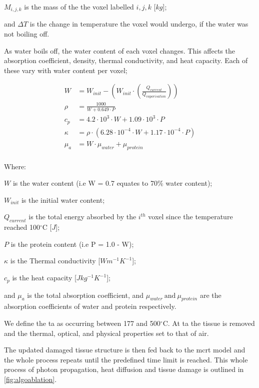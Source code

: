 	\indent $M_{i,j,k}$ is the mass of the the voxel labelled $i,j,k$ [$kg$];
	
	\indent and $\Delta T$ is the change in temperature the voxel would undergo, if the water was not boiling off.

	\medskip
	
As water boils off, the water content of each voxel changes. This affects the absorption coefficient, density, thermal conductivity, and heat capacity. Each of these vary with water content per voxel\cite{loiola2018thermal};

\begin{align}
W &= W_{init} - \left(W_{init} \cdot \left(\tfrac{Q_{current}}{Q_{vaporisation}}\right)\right) \\
\rho &= \frac{1000}{W + 0.649\cdot P} \\
c_p &= 4.2\cdot 10^{3}\cdot W + 1.09\cdot 10^{3}\cdot P \\
\kappa &= \rho \cdot (6.28\cdot 10^{-4}\cdot W + 1.17\cdot 10^{-4} \cdot P)\\
\mu_a &= W \cdot \mu_{water} + \mu_{protein}\\
\end{align}

\noindent Where:

\indent $W$ is the water content (i.e W = 0.7 equates to 70\% water content);

\indent $W_{init}$ is the initial water content;

\indent $Q_{current}$ is the total energy absorbed by the $i^{th}$ voxel since the temperature reached 100$^{\circ}$C [$J$];

\indent $P$ is the protein content (i.e P = 1.0 - W);

\indent $\kappa$ is the Thermal conductivity [$W m^{-1} K^{-1}$];

\indent $c_p$ is the heat capacity [$J kg^{-1} K^{-1}$];

\indent and $\mu_a$ is the total absorption coefficient, and $\mu_{water}\ \text{and}\ \mu_{protein}$ are the absorption coefficients of water and protein respectively.

\medskip

We define the \gls{ta} as occurring between 177 and 500$^{\circ}$C\cite{gerstmann1994char,mckenzie1986three,sagi1992heating}. At \gls{ta} the tissue is removed and the thermal, optical, and physical properties set to that of air.

The updated damaged tissue structure is then fed back to the \gls{mcrt} model and the whole process repeats until the predefined time limit is reached. This whole process of photon propagation, heat diffusion and tissue damage is outlined in \cref{fig:algoablation}.

